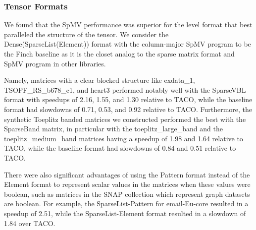 \subsubsection{Tensor Formats}
We found that the SpMV performance was superior for the level format that best paralleled the structure of the tensor. We consider the Dense(SparseList(Element)) format with the column-major SpMV program to be the Finch baseline as it is the closet analog to the sparse matrix format and SpMV program in other libraries.  

Namely, matrices with a clear blocked structure like exdata\_1, TSOPF\_RS\_b678\_c1, and heart3 performed notably well with the SparseVBL format with speedups of 2.16, 1.55, and 1.30 relative to TACO, while the baseline format had slowdowns of 0.71, 0.53, and 0.92 relative to TACO. Furthermore, the synthetic Toeplitz banded matrices we constructed performed the best with the SparseBand matrix, in particular with the toeplitz\_large\_band and the toeplitz\_medium\_band matrices having a speedup of 1.98 and 1.64 relative to TACO, while the baseline format had slowdowns of 0.84 and 0.51 relative to TACO.

There were also significant advantages of using the Pattern format instead of the Element format to represent scalar values in the matrices when these values were boolean, such as matrices in the SNAP collection which represent graph datasets are boolean. For example, the SparseList-Pattern for email-Eu-core resulted in a speedup of 2.51, while the SparseList-Element format resulted in a slowdown of 1.84 over TACO.

